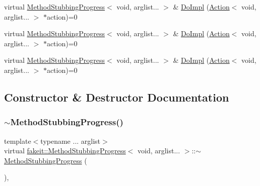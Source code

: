 \begin{DoxyCompactItemize}
\item 
virtual \mbox{\hyperlink{structfakeit_1_1MethodStubbingProgress}{Method\+Stubbing\+Progress}}$<$ void, arglist... $>$ \& \mbox{\hyperlink{structfakeit_1_1MethodStubbingProgress_3_01void_00_01arglist_8_8_8_01_4_a14b0b058c37c9539550e6d17395e1e60}{Do\+Impl}} (\mbox{\hyperlink{structfakeit_1_1Action}{Action}}$<$ void, arglist... $>$ $\ast$action)=0
\item 
virtual \mbox{\hyperlink{structfakeit_1_1MethodStubbingProgress}{Method\+Stubbing\+Progress}}$<$ void, arglist... $>$ \& \mbox{\hyperlink{structfakeit_1_1MethodStubbingProgress_3_01void_00_01arglist_8_8_8_01_4_a14b0b058c37c9539550e6d17395e1e60}{Do\+Impl}} (\mbox{\hyperlink{structfakeit_1_1Action}{Action}}$<$ void, arglist... $>$ $\ast$action)=0
\item 
virtual \mbox{\hyperlink{structfakeit_1_1MethodStubbingProgress}{Method\+Stubbing\+Progress}}$<$ void, arglist... $>$ \& \mbox{\hyperlink{structfakeit_1_1MethodStubbingProgress_3_01void_00_01arglist_8_8_8_01_4_a14b0b058c37c9539550e6d17395e1e60}{Do\+Impl}} (\mbox{\hyperlink{structfakeit_1_1Action}{Action}}$<$ void, arglist... $>$ $\ast$action)=0
\end{DoxyCompactItemize}


\subsection{Constructor \& Destructor Documentation}
\mbox{\label{structfakeit_1_1MethodStubbingProgress_3_01void_00_01arglist_8_8_8_01_4_a13f7ed59a8bd8e214f54b4a2946556ac}} 
\subsubsection{\texorpdfstring{$\sim$MethodStubbingProgress()}{~MethodStubbingProgress()}\hspace{0.1cm}{\footnotesize\ttfamily [1/9]}}
{\footnotesize\ttfamily template$<$typename ... arglist$>$ \\
virtual \mbox{\hyperlink{structfakeit_1_1MethodStubbingProgress}{fakeit\+::\+Method\+Stubbing\+Progress}}$<$ void, arglist... $>$\+::$\sim$\mbox{\hyperlink{structfakeit_1_1MethodStubbingProgress}{Method\+Stubbing\+Progress}} (\begin{DoxyParamCaption}{ }\end{DoxyParamCaption})\hspace{0.3cm}{\ttfamily [inline]}, {\ttfamily [virtual]}}


